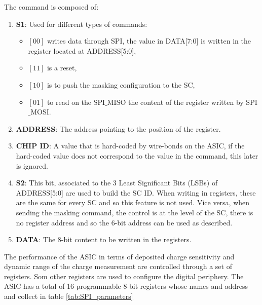 		The command is composed of: 
		\begin{enumerate}
			\item \textbf{S1}: Used for different types of commands: 
			\begin{itemize}
				\item $\left[00\right]$ writes data through SPI, the value in DATA[7:0] is written in the register located at ADDRESS[5:0],
				\item $\left[11\right]$ is a reset,
				\item $\left[10\right]$ is to push the masking configuration to the SC,
				\item $\left[01\right]$ to read on the SPI$\_$MISO the content of the register written by SPI$\_$MOSI.
			\end{itemize} 
			\item \textbf{ADDRESS}: The address pointing to the position of the register.
			\item \textbf{CHIP ID}: A value that is hard-coded by wire-bonds on the ASIC, if the hard-coded value does not correspond to the value in the command, this later is ignored. 
			\item \textbf{S2}: This bit, associated to the 3 Least Significant Bits (LSBs) of ADDRESS[5:0] are used to build the SC ID. When writing in registers, these are the same for every SC and so this feature is not used. Vice versa, when sending the masking command, the control is at the level of the SC, there is no register address and so the 6-bit address can be used as described.
			\item \textbf{DATA}: The 8-bit content to be written in the registers. 
		\end{enumerate}
		
		The performance of the ASIC in terms of deposited charge sensitivity and dynamic range of the charge measurement are controlled through a set of registers. Som other registers are used to configure the digital periphery. The ASIC has a total of 16 programmable 8-bit registers whose names and address and collect in table \ref{tab:SPI_parameters}
		
